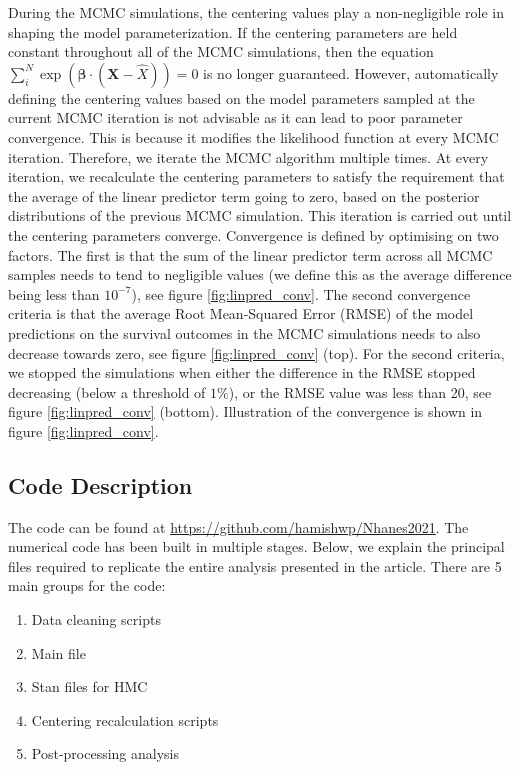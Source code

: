 \documentclass[
]{article}
\providecommand{\tightlist}{%
  \setlength{\itemsep}{0pt}\setlength{\parskip}{0pt}}
\begin{document}
During the MCMC simulations, the centering values play a non-negligible role in shaping the model parameterization. If the centering parameters are held constant throughout all of the MCMC simulations, then the equation \(\sum_i^N \exp{(\boldsymbol{\beta}\cdot(\boldsymbol{X}-\hat{X}))}=0\) is no longer guaranteed. However, automatically defining the centering values based on the model parameters sampled at the current MCMC iteration is not advisable as it can lead to poor parameter convergence. This is because it modifies the likelihood function at every MCMC iteration. Therefore, we iterate the MCMC algorithm multiple times. At every iteration, we recalculate the centering parameters to satisfy the requirement that the average of the linear predictor term going to zero, based on the posterior distributions of the previous MCMC simulation. This iteration is carried out until the centering parameters converge. Convergence is defined by optimising on two factors. The first is that the sum of the linear predictor term across all MCMC samples needs to tend to negligible values (we define this as the average difference being less than \(10^{-7}\)), see figure \ref{fig:linpred_conv}. The second convergence criteria is that the average Root Mean-Squared Error (RMSE) of the model predictions on the survival outcomes in the MCMC simulations needs to also decrease towards zero, see figure \ref{fig:linpred_conv} (top). For the second criteria, we stopped the simulations when either the difference in the RMSE stopped decreasing (below a threshold of \(1\%\)), or the RMSE value was less than 20, see figure \ref{fig:linpred_conv} (bottom). Illustration of the convergence is shown in figure \ref{fig:linpred_conv}.

\hypertarget{code-description}{%
\subsection{Code Description}\label{code-description}}

The code can be found at \url{https://github.com/hamishwp/Nhanes2021}. The numerical code has been built in multiple stages. Below, we explain the principal files required to replicate the entire analysis presented in the article. There are 5 main groups for the code:

\begin{enumerate}
\def\labelenumi{\arabic{enumi}.}
\tightlist
\item
  Data cleaning scripts
\item
  Main file
\item
  Stan files for HMC
\item
  Centering recalculation scripts
\item
  Post-processing analysis
\end{enumerate}
\end{document}
